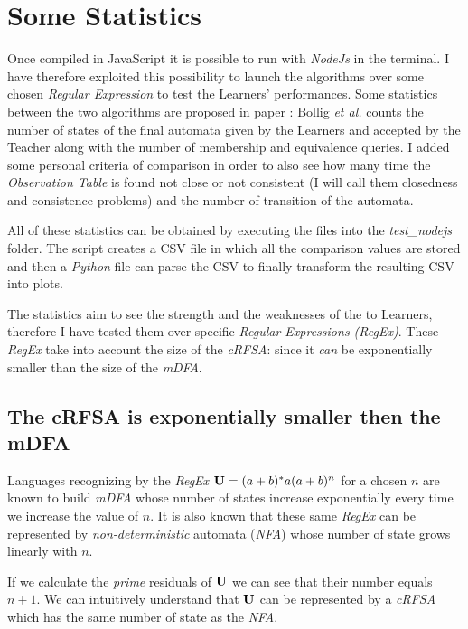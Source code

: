\section{Some Statistics}

Once compiled in JavaScript it is possible to run with \textit{NodeJs} in the terminal. I have therefore exploited this possibility to launch the algorithms over some chosen \textit{Regular Expression} to test the Learners' performances. Some statistics between the two algorithms are proposed in paper \cite{NLPaper}: Bollig \textit{et al.} counts the number of states of the final automata given by the Learners and accepted by the Teacher along with the number of membership and equivalence queries. I added some personal criteria of comparison in order to also see how many time the \textit{Observation Table} is found not close or not consistent (I will call them closedness and consistence problems) and the number of transition of the automata.

All of these statistics can be obtained by executing the files into the \textit{test\_nodejs} folder. The script creates a CSV file in which all the comparison values are stored and then a \textit{Python} file can parse the CSV to finally transform the resulting CSV into plots.

The statistics aim to see the strength and the weaknesses of the to Learners, therefore I have tested them over specific \textit{Regular Expressions (RegEx)}. These \textit{RegEx} take into account the size of the \textit{cRFSA}: since it \textit{can} be exponentially smaller than the size of the \textit{mDFA}.

\subsection{The cRFSA is exponentially smaller then the mDFA}
Languages recognizing by the \textit{RegEx} $\mathbf{U} = (a+b)^*a(a+b)^n$ for a chosen $n$ are known to build \textit{mDFA} whose number of states increase exponentially every time we increase the value of $n$. It is also known that these same \textit{RegEx} can be represented by \textit{non-deterministic} automata (\textit{NFA}) whose number of state grows linearly with $n$.

If we calculate the \textit{prime} residuals of $\mathbf{U}$ we can see that their number equals $n+1$. We can intuitively understand that $\mathbf{U}$ can be represented by a \textit{cRFSA} which has the same number of state as the \textit{NFA}.

